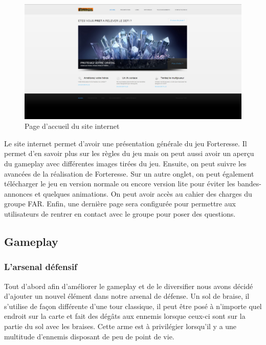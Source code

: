 \documentclass[a4paper, 12pt]{article}
\begin{document}
	\begin{figure}[!ht]
		\centerline{\includegraphics[scale=0.3]{siteprojet.png}}
		\caption*{Page d'accueil du site internet}
	\end{figure}	 
	 
	 Le site internet permet d’avoir une présentation générale du jeu Forteresse. Il permet d’en savoir plus sur les règles du jeu mais on peut aussi avoir un aperçu du gameplay avec différentes images tirées du jeu. Ensuite, on peut suivre les avancées de la réalisation de Forteresse. Sur un autre onglet, on peut également télécharger le jeu en version normale ou encore version lite pour éviter les bandes-annonces et quelques animations. On peut avoir accès au cahier des charges du groupe FAR. Enfin, une dernière page sera configurée pour permettre aux utilisateurs de rentrer en contact avec le groupe pour poser des questions.


	\subsection{Gameplay}
		
		\subsubsection{L'arsenal défensif}
		Tout d’abord afin d’améliorer le gameplay et de le diversifier nous avons décidé d’ajouter un nouvel élément dans notre arsenal de défense. Un sol de braise, il s’utilise de façon différente d’une tour classique, il peut être posé à n’importe quel endroit sur la carte et fait des dégâts aux ennemis lorsque ceux-ci sont sur la partie du sol avec les braises. Cette arme est à privilégier lorsqu’il y a une multitude d’ennemis disposant de peu de point de vie.
\end{document}
